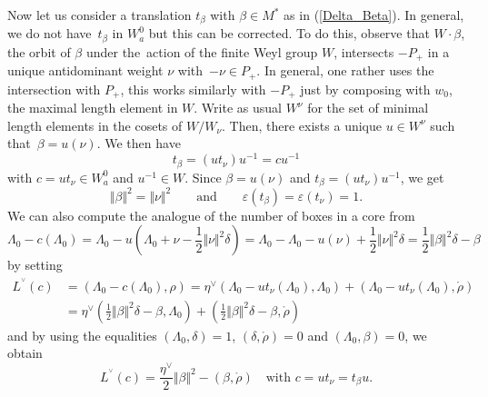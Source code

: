 \documentclass[10pt,a4paper]{amsart}
\numberwithin{equation}{section}
\begin{document}
Now let us consider a translation $t_{\beta}$ with $\beta\in M^{\ast}$ as in
(\ref{Delta_Beta}). In general, we do not have~$t_{\beta}$ in $W_{a}^{0}$ but
this can be corrected. To do this, observe that $W\cdot\beta$, the orbit of
$\beta$ under the~action of the finite Weyl group $W$, intersects $-P_{+}$ in
a unique antidominant weight $\nu$ with~${-\nu\in P_{+}}$. In general, one
rather uses the intersection with $P_{+}$, this works similarly with $-P_{+}$
just by composing with $w_{0}$, the maximal length element in $W$. Write as
usual $W^{\nu}$ for the set of minimal length elements in the cosets of
$W/W_{\nu}$. Then, there exists a unique $u\in W^{\nu}$ such that~${\beta=u(\nu)}$. We then have
\[
t_{\beta}=(ut_{\nu})u^{-1}=cu^{-1}%
\]
with $c=ut_{\nu}\in W_{a}^{0}$ and $u^{-1}\in W$. Since $\beta=u(\nu)$ and
$t_{\beta}=(ut_{\nu})u^{-1}$, we get
\[
 \Vert \beta \Vert ^{2}= \Vert \nu \Vert ^{2}\qquad\text{and}\qquad \varepsilon(t_{\beta})=\varepsilon(t_{\nu})=1.
\]
We can also compute the analogue of the number of boxes in a core from%
\[
\Lambda_{0}-c(\Lambda_{0})=\Lambda_{0}-u\left( \Lambda_{0}+\nu-\frac{1}%
{2} \Vert \nu \Vert ^{2}\delta\right) =\Lambda_{0}-\Lambda_{0}%
-u(\nu)+\frac{1}{2} \Vert \nu \Vert ^{2}\delta=\frac{1}{2} \Vert
\beta \Vert ^{2}\delta-\beta
\]
by setting
\begin{align*}
L^{^{\vee}}(c)&=(\Lambda_{0}-c(\Lambda_{0}),\rho) =\eta^{\vee}(
\Lambda_{0}-ut_{\nu}(\Lambda_{0}),\Lambda_{0}) +( \Lambda
_{0}-ut_{\nu}(\Lambda_{0}),\mathring{\rho}) \\
& =\eta^{\vee}\left( \frac{1}{2} \Vert \beta \Vert ^{2}\delta
-\beta,\Lambda_{0}\right) +\left( \frac{1}{2} \Vert \beta \Vert
^{2}\delta-\beta,\mathring{\rho}\right)
\end{align*}
and by using the equalities $(\Lambda_{0},\delta)=1$, $(\delta,\mathring{\rho
})=0$ and $(\Lambda_{0},\beta)=0$, we obtain
\[
L^{^{\vee}}(c)=\frac{\eta^{\vee}}{2} \Vert \beta \Vert ^{2}%
-(\beta,\mathring{\rho})\quad \text{with }c=ut_{\nu}=t_{\beta}u.
\]
\end{document}
